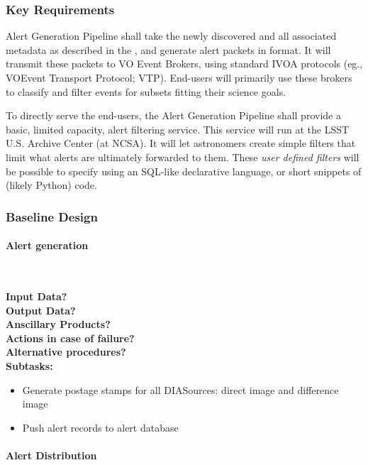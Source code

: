 \subsubsection{Key Requirements}

Alert Generation Pipeline shall take the newly discovered \DIASources and all associated metadata as described
in the \DPDD, and generate alert packets in \VOEvent format. It will transmit these packets to VO Event
Brokers, using standard IVOA protocols (eg., VOEvent Transport Protocol; VTP\@). End-users will primarily use these brokers to classify and filter events for subsets fitting their science goals.

To directly serve the end-users, the Alert Generation Pipeline shall provide a basic, limited capacity, alert filtering service. This service will run at the LSST U.S. Archive Center (at NCSA). It will let astronomers create simple filters that limit what alerts are ultimately forwarded to them. These \emph{user defined filters} will be possible to specify using an SQL-like declarative language, or short snippets of (likely Python) code.

\subsubsection{Baseline Design}

\paragraph{Alert generation}~

\noindent
{\bf Input Data?}\\
{\bf Output Data?}\\
{\bf Anscillary Products?}\\
{\bf Actions in case of failure?}\\
{\bf Alternative procedures?}\\

\noindent
{\bf Subtasks:}
\begin{itemize}
\item Generate postage stamps for all DIASources: direct image and difference image
\item Push alert records to alert database
\end{itemize}

\paragraph{Alert Distribution}~

